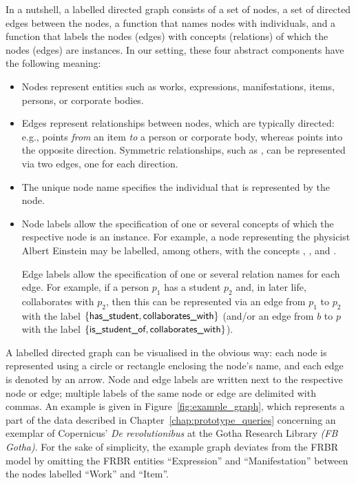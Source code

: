 In a nutshell, a labelled directed graph consists of a set of nodes, a set of directed edges between
the nodes, a function that names nodes with individuals,
and a function that labels the nodes (edges) with concepts (relations)
of which the nodes (edges) are instances.
In our setting, these four abstract components have the following meaning:
%
\begin{itemize}
  \item 
    Nodes represent entities such as works, expressions, manifestations, items,
    persons, or corporate bodies.
  \item 
    Edges represent relationships between nodes, which are typically directed:
    e.g.,  points \emph{from} an item
    \emph{to} a person or corporate body,
    whereas  points into the opposite direction.
    Symmetric relationships, such as ,
    can be represented via two edges, one for each direction.
  \item 
    The unique node name specifies the individual that is represented by the node.
  \item 
    Node labels allow the specification of one or several concepts
    of which the respective node is an instance.
    For example, a node representing the physicist Albert Einstein
    may be labelled, among others, with the concepts , ,
    and .

    Edge labels allow the specification of one or several relation names for each edge.
    For example, if a person $p_1$ has a student $p_2$ and, in later life, 
    collaborates with $p_2$, then this can be represented via an edge from $p_1$ to $p_2$
    with the label $\{\textsf{has\_student},\textsf{collaborates\_with}\}$
    (and/or an edge from $b$ to $p$ with the label $\{\textsf{is\_student\_of},\textsf{collaborates\_with}\}$).
\end{itemize}
%
A labelled directed graph can be visualised in the obvious way:
each node is represented using a circle or rectangle
enclosing the node's name,
and each edge is denoted by an arrow.
Node and edge labels are written next to the respective node or edge;
multiple labels of the same node or edge are delimited with commas.
An example is given in Figure~\ref{fig:example_graph},
which represents a part of the data described in Chapter~\ref{chap:prototype_queries}
concerning an exemplar of Copernicus' \emph{De revolutionibus} at the
Gotha Research Library \emph{(FB Gotha)}.
For the sake of simplicity, the example graph deviates from the FRBR model
by omitting the FRBR entities \enquote{Expression} and \enquote{Manifestation}
between the nodes labelled \enquote{Work} and \enquote{Item}.


